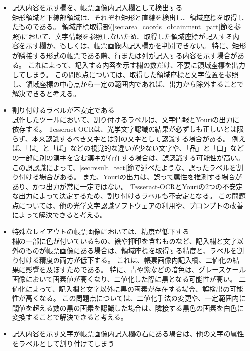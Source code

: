 \begin{itemize}
    \item 記入内容を示す欄を、帳票画像内記入欄として検出する\\
        矩形領域と下線部領域は、それぞれ矩形と直線を検出し、領域座標を取得したものである。
        領域座標取得部(\ref{sec:area_coords_obtainment_part}節を参照)において、文字情報を参照しないため、取得した領域座標が記入する内容を示す欄か、もしくは、帳票画像内記入欄かを判別できない。
        特に、矩形が隣接する形式の帳票である際、行または列が記入する内容を示す場合がある。
        これによって、記入する内容を示す欄の数だけ、不要に領域座標を出力してしまう。
        この問題点については、取得した領域座標と文字位置を参照し、領域座標の中心点から一定の範囲内であれば、出力から除外することで解決できると考える。
    \item 割り付けるラベルが不安定である\\
        試作したツールにおいて、割り付けるラベルは、文字情報とYouriの出力に依存する。
        Tesseract-OCRは、光学文字認識の結果が必ずしも正しいとは限らず、本来認識するべき文字とは別の文字として認識する場合がある。
        例えば、「は」と「ば」などの視覚的な違いが少ない文字や、「品」と「口」などの一部に別の漢字を含む漢字が存在する場合は、誤認識する可能性が高い。
        この誤認識によって、\ref{sec:result_rect}節で述べたような、誤ったラベルを割り付ける場合がある。
        また、Youriの出力は、誤って属性を推測する場合があり、かつ出力が常に一定ではない。
        Tesseract-OCRとYouriの2つの不安定な出力によって決定するため、割り付けるラベルも不安定となる。
        この問題点については、他の光学文字認識ソフトウェアの利用や、プロンプトの改善によって解決できると考える。
    \item 特殊なレイアウトの帳票画像においては、精度が低下する\\
        欄の一部に色が付いているもの、絵や押印を含むものなど、記入欄と文字以外のものが帳票画像にある場合は、領域座標を取得する精度と、ラベルを割り付ける精度の両方が低下する。
        これは、帳票画像内記入欄、二値化の結果に影響を及ぼすためである。
        特に、青や紫などの暗色は、グレースケール画像において画素値が高くなり、二値化した際に黒となる可能性が高い。
        二値化によって、記入欄と文字以外に黒の画素が存在する場合、誤検出の可能性が高くなる。
        この問題点については、二値化手法の変更や、一定範囲内に閾値を超える数の黒の画素を認識した場合は、隣接する黒色の画素を白色に変換することで解決できると考える。
    \item 記入内容を示す文字が帳票画像内記入欄の右にある場合は、他の文字の属性をラベルとして割り付けてしまう\\

\end{itemize}
